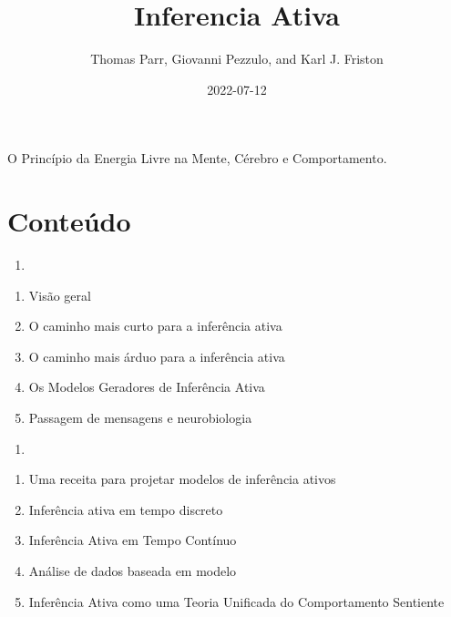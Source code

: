 \documentclass[
  12pt,
]{book}
\title{Inferencia Ativa}
\author{Thomas Parr, Giovanni Pezzulo, and Karl J. Friston}
\date{2022-07-12}
\providecommand{\tightlist}{%
  \setlength{\itemsep}{0pt}\setlength{\parskip}{0pt}}
\begin{document}
\maketitle

{
\hypersetup{linkcolor=}
\setcounter{tocdepth}{1}
\tableofcontents
}
\listoffigures
\listoftables
O Princípio da Energia Livre na Mente, Cérebro e Comportamento.

\hypertarget{conteuxfado}{%
\chapter*{Conteúdo}\label{conteuxfado}}

\begin{enumerate}
\def\labelenumi{(\Roman{enumi})}
\tightlist
\item
\end{enumerate}

\begin{enumerate}
\def\labelenumi{\arabic{enumi}.}
\tightlist
\item
  Visão geral\\
\item
  O caminho mais curto para a inferência ativa\\
\item
  O caminho mais árduo para a inferência ativa\\
\item
  Os Modelos Geradores de Inferência Ativa\\
\item
  Passagem de mensagens e neurobiologia
\end{enumerate}

\begin{enumerate}
\def\labelenumi{(\Roman{enumi})}
\setcounter{enumi}{1}
\tightlist
\item
\end{enumerate}

\begin{enumerate}
\def\labelenumi{\arabic{enumi}.}
\setcounter{enumi}{5}
\tightlist
\item
  Uma receita para projetar modelos de inferência ativos
\item
  Inferência ativa em tempo discreto
\item
  Inferência Ativa em Tempo Contínuo
\item
  Análise de dados baseada em modelo
\item
  Inferência Ativa como uma Teoria Unificada do Comportamento Sentiente
\end{enumerate}
\end{document}
